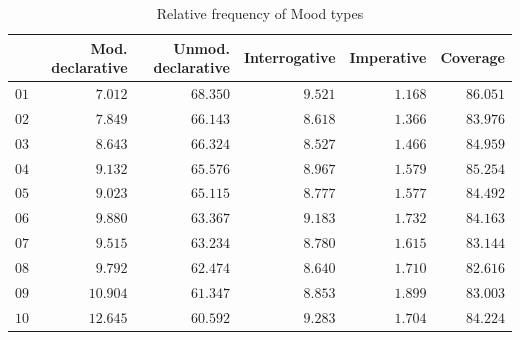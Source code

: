 \begin{table}
\centering
\footnotesize
\begin{tabular}{lrrrrr}
\toprule
{} &  Mod. declarative &  Unmod. declarative &  Interrogative &  Imperative &  Coverage \\
\midrule
$01$ &             $7.012$ &              $68.350$ &          $9.521$ &       $1.168$ &    $86.051$ \\
$02$ &             $7.849$ &              $66.143$ &          $8.618$ &       $1.366$ &    $83.976$ \\
$03$ &             $8.643$ &              $66.324$ &          $8.527$ &       $1.466$ &    $84.959$ \\
$04$ &             $9.132$ &              $65.576$ &          $8.967$ &       $1.579$ &    $85.254$ \\
$05$ &             $9.023$ &              $65.115$ &          $8.777$ &       $1.577$ &    $84.492$ \\
$06$ &             $9.880$ &              $63.367$ &          $9.183$ &       $1.732$ &    $84.163$ \\
$07$ &             $9.515$ &              $63.234$ &          $8.780$ &       $1.615$ &    $83.144$ \\
$08$ &             $9.792$ &              $62.474$ &          $8.640$ &       $1.710$ &    $82.616$ \\
$09$ &            $10.904$ &              $61.347$ &          $8.853$ &       $1.899$ &    $83.003$ \\
$10$ &            $12.645$ &              $60.592$ &          $9.283$ &       $1.704$ &    $84.224$ \\
\bottomrule
\end{tabular}
\caption{Relative frequency of Mood types}
\label{tab:mood_types_p}
\end{table}

